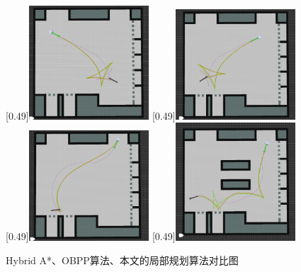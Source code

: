 \documentclass[master,academic]{ysuthesis} %
\begin{document}
		\begin{figure}[H]
			\centering
			[0.49\textwidth]{\includegraphics[width=0.4\textwidth]{fig/局部对比1.png}}
			[0.49\textwidth]{\includegraphics[width=0.4\textwidth]{fig/局部对比2.png}}
			[0.49\textwidth]{\includegraphics[width=0.4\textwidth]{fig/局部对比3.png}}
			[0.49\textwidth]{\includegraphics[width=0.4\textwidth]{fig/局部对比4.png}}
			\caption{Hybrid A*、OBPP算法、本文的局部规划算法对比图}
			\label{fig:Hybrid A*、OBPP算法、本文的局部规划算法对比图}
		\end{figure}
\end{document}
